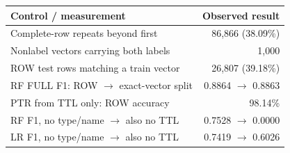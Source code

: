 \centering\footnotesize
\begin{tabular}{@{}p{4.35cm}r@{}}
\toprule
Control / measurement & Observed result\\\midrule
Complete-row repeats beyond first & 86,866 (38.09\%)\\
Nonlabel vectors carrying both labels & 1,000\\
ROW test rows matching a train vector & 26,807 (39.18\%)\\
RF FULL F1: ROW $\to$ exact-vector split & 0.8864 $\to$ 0.8863\\
PTR from TTL only: ROW accuracy & 98.14\%\\
RF F1, no type/name $\to$ also no TTL & 0.7528 $\to$ 0.0000\\
LR F1, no type/name $\to$ also no TTL & 0.7419 $\to$ 0.6026\\
\bottomrule
\end{tabular}
